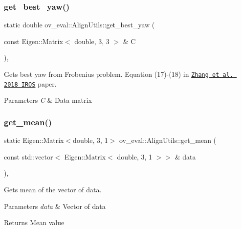\subsubsection{\texorpdfstring{get\+\_\+best\+\_\+yaw()}{get\_best\_yaw()}}
{\footnotesize\ttfamily static double ov\+\_\+eval\+::\+Align\+Utils\+::get\+\_\+best\+\_\+yaw (\begin{DoxyParamCaption}\item[{const Eigen\+::\+Matrix$<$ double, 3, 3 $>$ \&}]{C }\end{DoxyParamCaption})\hspace{0.3cm}{\ttfamily [inline]}, {\ttfamily [static]}}



Gets best yaw from Frobenius problem. Equation (17)-\/(18) in \href{http://rpg.ifi.uzh.ch/docs/IROS18_Zhang.pdf}{\tt Zhang et al. 2018 I\+R\+OS} paper. 


\begin{DoxyParams}{Parameters}
{\em C} & Data matrix \\
\hline
\end{DoxyParams}
\mbox{\label{classov__eval_1_1AlignUtils_a773b70968bab53fcaf45db308a70fe82}} 
\subsubsection{\texorpdfstring{get\+\_\+mean()}{get\_mean()}}
{\footnotesize\ttfamily static Eigen\+::\+Matrix$<$double, 3, 1$>$ ov\+\_\+eval\+::\+Align\+Utils\+::get\+\_\+mean (\begin{DoxyParamCaption}\item[{const std\+::vector$<$ Eigen\+::\+Matrix$<$ double, 3, 1 $>$$>$ \&}]{data }\end{DoxyParamCaption})\hspace{0.3cm}{\ttfamily [inline]}, {\ttfamily [static]}}



Gets mean of the vector of data. 


\begin{DoxyParams}{Parameters}
{\em data} & Vector of data \\
\hline
\end{DoxyParams}
\begin{DoxyReturn}{Returns}
Mean value 
\end{DoxyReturn}
\mbox{\label{classov__eval_1_1AlignUtils_a222cc11925f47bb8055aaf73d4336490}} 
